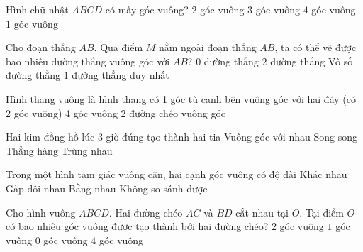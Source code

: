 \begin{ex} %
Hình chữ nhật $ABCD$ có mấy góc vuông?
\choice
{$2$ góc vuông}
{$3$ góc vuông}
{\True $4$ góc vuông}
{$1$ góc vuông}
\end{ex}

\begin{ex} %
Cho đoạn thẳng $AB$. Qua điểm $M$ nằm ngoài đoạn thẳng $AB$, ta có thể vẽ được bao nhiêu đường thẳng vuông góc với $AB$?
\choice
{$0$ đường thẳng}
{$2$ đường thẳng}
{Vô số đường thẳng}
{\True $1$ đường thẳng duy nhất}
\end{ex}

\begin{ex} %
Hình thang vuông là hình thang có
\choice
{1 góc tù}
{ cạnh bên vuông góc với hai đáy (có 2 góc vuông)}
{4 góc vuông}
{2 đường chéo vuông góc}
\end{ex}

\begin{ex} %
Hai kim đồng hồ lúc 3 giờ đúng tạo thành hai tia
\choice
{\True Vuông góc với nhau}
{Song song}
{Thẳng hàng}
{Trùng nhau}
\end{ex}

\begin{ex} %
Trong một hình tam giác vuông cân, hai cạnh góc vuông có độ dài
\choice
{Khác nhau}
{Gấp đôi nhau}
{\True Bằng nhau}
{Không so sánh được}
\end{ex}

\begin{ex} %
Cho hình vuông $ABCD$. Hai đường chéo $AC$ và $BD$ cắt nhau tại $O$. Tại điểm $O$ có bao nhiêu góc vuông được tạo thành bởi hai đường chéo?
\choice
{$2$ góc vuông}
{$1$ góc vuông}
{$0$ góc vuông}
{\True $4$ góc vuông}
\end{ex}


